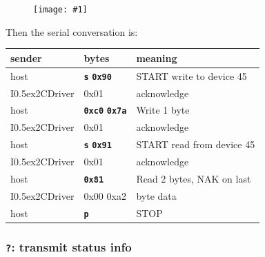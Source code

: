 \documentclass{article}
\newcommand{\two}{\raise0.5ex\hbox{\footnotesize{2}}}
\newcommand{\iic}{I\two{}C}
\newcommand{\iicdriver}{I\two{}CDriver}
\newcommand{\png}[1]{
\begin{figure}[H]
\begin{center}
\texttt{[image: \#1]}
\end{center}
\end{figure}
}
\newcommand{\mach}[1]{\texttt{\textbf{#1}}}
\newcommand{\gap}{\vspace{10pt}}
\begin{document}
\png{img/i2cdriver/hero3}

Then the serial conversation is:


\gap\begin{tabular}{lll}
sender & bytes & meaning \\ \hline
host & \mach{s} \mach{0x90}    & START write to device 45 \\
\rowcolor{Gray}
\iicdriver{} & 0x01 & acknowledge \\
host & \mach{0xc0} \mach{0x7a} & Write 1 byte \\
\rowcolor{Gray}
\iicdriver{} & 0x01 & acknowledge \\
host & \mach{s} \mach{0x91}    & START read from device 45 \\
\rowcolor{Gray}
\iicdriver{} & 0x01 & acknowledge \\
host & \mach{0x81}          & Read 2 bytes, NAK on last \\
\rowcolor{Gray}
\iicdriver{} & 0x00 0xa2 & byte data \\
host & \mach{p}             & STOP \\
\end{tabular}\gap

\newcommand{\byteseq}[1]{%
\gap
\begin{bytefield}[endianness=big,bitwidth=3.2em]{8}
  \bitheader{0-7} \\
  #1
\end{bytefield}
}

\newcommand{\ackfield}{%
\byteseq{
  \bitbox{1}{0}
  \bitbox{1}{0}
  \bitbox{1}{1}
  \bitbox{1}{1}
  \bitbox{1}{0}
  \bitbox{1}{ARB}
  \bitbox{1}{TO}
  \bitbox{1}{ACK}
}

\textbf{ARB} is set if bus arbitration is lost during the transmission

\textbf{TO} is set if the transmission times out

\textbf{ACK} is set if the \iic{} device acknowledged the transmission

}
\newcommand{\ackbyte}{%
The single byte response is:

\ackfield
}

\subsubsection{\mach{?}: transmit status info}

\byteseq{
  \bitbox{8}{\mach{?} (0x3f)}\\
}
\end{document}
